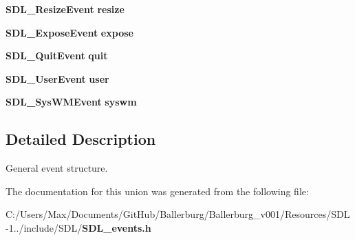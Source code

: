 \begin{DoxyCompactItemize}
\item 
{\bf S\+D\+L\+\_\+\+Resize\+Event} {\bfseries resize}\label{union_s_d_l___event_a6e82d8628b9402aaa7660ebf0162228a}

\item 
{\bf S\+D\+L\+\_\+\+Expose\+Event} {\bfseries expose}\label{union_s_d_l___event_ae70b3cbeb6e05e3e1322a906c9fbe7d5}

\item 
{\bf S\+D\+L\+\_\+\+Quit\+Event} {\bfseries quit}\label{union_s_d_l___event_a102a3008afe67a1c02ae7504e232dcef}

\item 
{\bf S\+D\+L\+\_\+\+User\+Event} {\bfseries user}\label{union_s_d_l___event_ab7c394e3ce7bf1e4f8d68bc0e9f1b042}

\item 
{\bf S\+D\+L\+\_\+\+Sys\+W\+M\+Event} {\bfseries syswm}\label{union_s_d_l___event_ab3b2eaf5348d4c50a51b1f297fdef537}

\end{DoxyCompactItemize}


\subsection{Detailed Description}
General event structure. 

The documentation for this union was generated from the following file\+:\begin{DoxyCompactItemize}
\item 
C\+:/\+Users/\+Max/\+Documents/\+Git\+Hub/\+Ballerburg/\+Ballerburg\+\_\+v001/\+Resources/\+S\+D\+L-\/1../include/\+S\+D\+L/{\bf S\+D\+L\+\_\+events.\+h}\end{DoxyCompactItemize}
